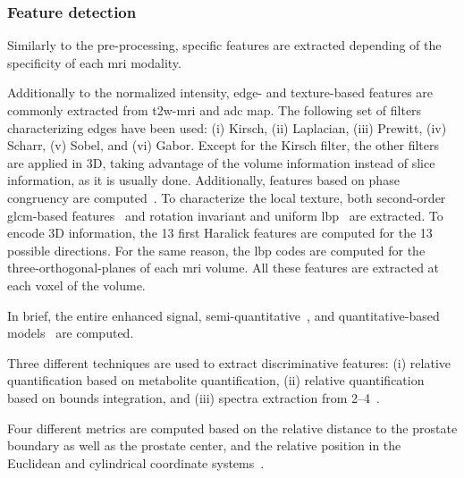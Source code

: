 \subsubsection{Feature detection}\label{subsec:chp6:method:fea-det}
Similarly to the pre-processing, specific features are extracted
depending of the specificity of each \ac{mri} modality.
\begin{description}[style=unboxed,leftmargin=0cm]
\item[\ac{t2w}-\ac{mri} and \ac{adc} map features]
Additionally to the normalized intensity, edge- and texture-based
features are commonly extracted from \ac{t2w}-\ac{mri} and \ac{adc}
map.
The following set of filters characterizing edges have been used: (i)
Kirsch, (ii) Laplacian, (iii) Prewitt, (iv) Scharr, (v) Sobel, and
(vi) Gabor.
Except for the Kirsch filter, the other filters are applied in 3D,
taking advantage of the volume information instead of slice
information, as it is usually done.
Additionally, features based on phase congruency are
computed~\cite{kovesi1999image}.
To characterize the local texture, both second-order \ac{glcm}-based
features~\cite{Haralick1973} and rotation invariant and uniform
\ac{lbp}~\cite{ojala2002multiresolution} are extracted.
To encode 3D information, the 13 first Haralick features are computed
for the 13 possible directions.
For the same reason, the \ac{lbp} codes are computed for the
three-orthogonal-planes of each \ac{mri} volume.
All these features are extracted at each voxel of the volume.

\item[\ac{dce}-\ac{mri} features]
In brief, the entire enhanced signal, semi-quantitative~\cite{Huisman2001}, and
quantitative-based
models~\cite{brix1991pharmacokinetic,hoffmann1995pharmacokinetic,tofts1995quantitative,giannini2015fully}
are computed.

\item[\ac{mrsi} features]
Three different techniques are used to extract
discriminative features: (i) relative quantification based on
metabolite quantification, (ii) relative
quantification based on bounds integration, and (iii) spectra
extraction from \SIrange{2}{4}{\ppm}~\cite{Lemaitre2016thesis}.

\item[Anatomical features]
Four different metrics are computed based on the relative distance to the
prostate boundary as well as the prostate center, and the relative
position in the Euclidean and cylindrical coordinate
systems~\cite{Chen2002,Litjens2014}.

\end{description}


